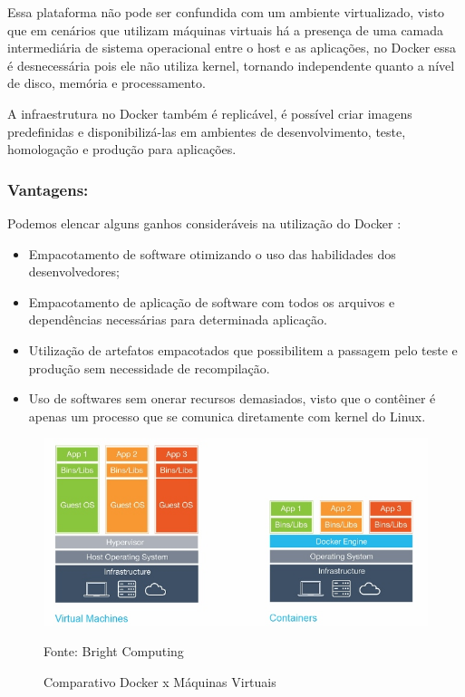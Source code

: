 Essa plataforma não pode ser confundida com um ambiente virtualizado, visto que em cenários que utilizam máquinas virtuais há a presença de uma camada intermediária de sistema operacional entre o host e as aplicações, no Docker essa é desnecessária pois ele não utiliza kernel, tornando independente quanto a nível de disco, memória e processamento.\cite{mouat}

A infraestrutura no Docker também é replicável, é possível criar imagens predefinidas e disponibilizá-las em ambientes de desenvolvimento, teste, homologação e produção para aplicações.\cite{mattiaskane}

\subsubsection{Vantagens:}
Podemos elencar alguns ganhos consideráveis na utilização do Docker \cite{scampini} :
\begin{itemize}
\item Empacotamento de software otimizando o uso das habilidades dos desenvolvedores;
\item Empacotamento de aplicação de software com todos os arquivos e dependências necessárias para determinada aplicação.
\item Utilização de artefatos empacotados que possibilitem a passagem pelo teste e produção sem necessidade de recompilação.
\item Uso de softwares sem onerar recursos demasiados, visto que o contêiner é apenas um processo que se comunica diretamente com kernel do Linux.
\end{itemize}

\begin{figure} [htb]
	\centering

	\includegraphics[width=0.8\linewidth]{imagens/dockerXvm}
	\caption{Comparativo Docker x Máquinas Virtuais}
	Fonte: Bright Computing\footnotemark
	\label{fig:dockerXvm}

\end{figure}
	


